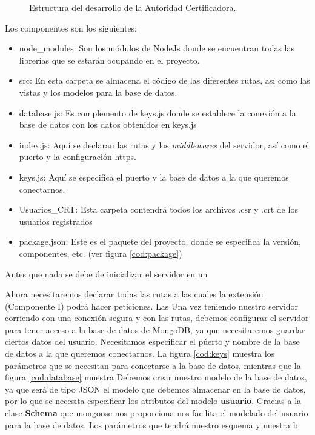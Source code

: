 \documentclass[12pt, a4paper, titlepage]{report}
\begin{document}
	        \begin{figure}[H]
        		\begin{center}
        		\caption{Estructura del desarrollo de la Autoridad Certificadora.}
	            \label{fig:paqueteAutoridadCert2}
	            \end{center}
	        \end{figure} 
            
             Los componentes son los siguientes:
             \begin{itemize}
                 \item node\_modules: Son los módulos de NodeJs donde se encuentran todas las librerías que se estarán ocupando en el proyecto.
                 \item src: En esta carpeta se almacena el código de las diferentes rutas, así como las vistas y los modelos para la base de datos.
                 \item database.js: Es complemento de keys.js donde se establece la conexión a la base de datos con los datos obtenidos en keys.js
                 \item index.js: Aquí se declaran las rutas y los \textit{middlewares} del servidor, así como el puerto y la configuración https.
                 \item keys.js: Aquí se especifica el puerto y la base de datos a la que queremos conectarnos.
                 \item Usuarios\_CRT: Esta carpeta contendrá todos los archivos .csr y .crt de los usuarios registrados
                 \item package.json: Este es el paquete del proyecto, donde se especifica la versión, componentes, etc. (ver figura \ref{cod:package})
             \end{itemize}
             
            
            Antes que nada se debe de inicializar el servidor en un 
             
            Ahora necesitaremos declarar todas las rutas a las cuales la extensión (Componente I) podrá hacer peticiones. Las 
            Una vez teniendo nuestro servidor corriendo con una conexión segura y con las rutas, debemos configurar el servidor para tener acceso a la base de datos de MongoDB, ya que necesitaremos guardar ciertos datos del usuario.
            Necesitamos especificar el púerto y nombre de la base de datos a la que queremos conectarnos. La figura \ref{cod:keys} muestra los parámetros que se necesitan para conectarse a la base de datos, mientras que la figura \ref{cod:database} muestra 
            Debemos crear nuestro modelo de la base de datos, ya que será de tipo JSON el modelo que debemos almacenar en la base de datos, por lo que se necesita especificar los atributos del modelo \textbf{usuario}. Gracias a la clase \textbf{Schema} que mongoose nos proporciona nos facilita el modelado del usuario para la base de datos. Los parámetros que tendrá nuestro esquema y nuestra b
            
\end{document}
